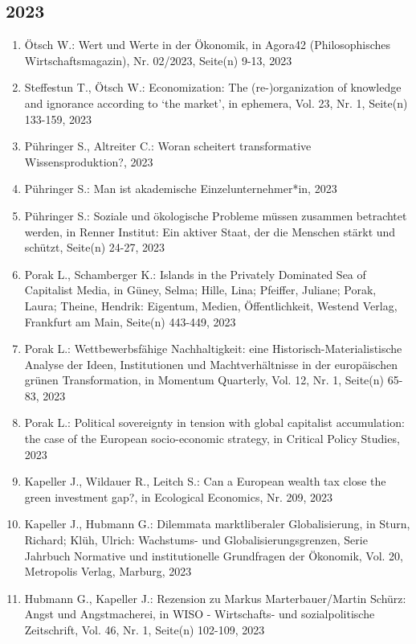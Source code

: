 \subsection*{2023}
\begin{enumerate}
    	 \item Ötsch W.: Wert und Werte in der Ökonomik, in Agora42 (Philosophisches Wirtschaftsmagazin), Nr. 02/2023, Seite(n) 9-13, 2023
	 \item Steffestun T., Ötsch W.: Economization: The (re-)organization of knowledge and ignorance according to ‘the market’, in ephemera, Vol. 23, Nr. 1, Seite(n) 133-159, 2023
	 \item Pühringer S., Altreiter C.: Woran scheitert transformative Wissensproduktion?, 2023
	 \item Pühringer S.: Man ist akademische Einzelunternehmer*in, 2023
	 \item Pühringer S.: Soziale und ökologische Probleme müssen zusammen betrachtet werden, in Renner Institut: Ein aktiver Staat, der die Menschen stärkt und schützt, Seite(n) 24-27, 2023
	 \item Porak L., Schamberger K.: Islands in the Privately Dominated Sea of Capitalist Media, in Güney, Selma; Hille, Lina; Pfeiffer, Juliane; Porak, Laura; Theine, Hendrik: Eigentum, Medien, Öffentlichkeit, Westend Verlag, Frankfurt am Main, Seite(n) 443-449, 2023
	 \item Porak L.: Wettbewerbsfähige Nachhaltigkeit: eine Historisch-Materialistische Analyse der Ideen, Institutionen und Machtverhältnisse in der europäischen grünen Transformation, in Momentum Quarterly, Vol. 12, Nr. 1, Seite(n) 65-83, 2023
	 \item Porak L.: Political sovereignty in tension with global capitalist accumulation: the case of the European socio-economic strategy, in Critical Policy Studies, 2023
	 \item Kapeller J., Wildauer R., Leitch S.: Can a European wealth tax close the green investment gap?, in Ecological Economics, Nr. 209, 2023
	 \item Kapeller J., Hubmann G.: Dilemmata marktliberaler Globalisierung, in Sturn, Richard; Klüh, Ulrich: Wachstums- und Globalisierungsgrenzen, Serie Jahrbuch Normative und institutionelle Grundfragen der Ökonomik, Vol. 20, Metropolis Verlag, Marburg, 2023
	 \item Hubmann G., Kapeller J.: Rezension zu Markus Marterbauer/Martin Schürz: Angst und Angstmacherei, in WISO - Wirtschafts- und sozialpolitische Zeitschrift, Vol. 46, Nr. 1, Seite(n) 102-109, 2023

\end{enumerate}
